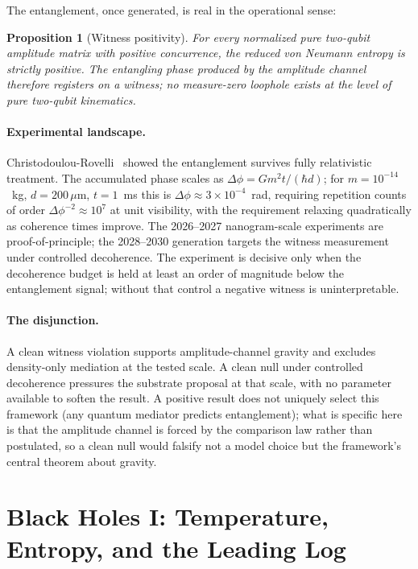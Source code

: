 \documentclass[11pt,letterpaper]{article}
\newtheorem{proposition}[theorem]{Proposition}
\theoremstyle{definition}
\begin{document}
The entanglement, once generated, is real in the operational sense:

\begin{proposition}[Witness positivity]\label{prop:witness}
For every normalized pure two-qubit amplitude matrix with positive
concurrence, the reduced von Neumann entropy is strictly positive.
The entangling phase produced by the amplitude channel therefore
registers on a witness; no measure-zero loophole exists at the level
of pure two-qubit kinematics.
\end{proposition}

\paragraph{Experimental landscape.}
Christodoulou-Rovelli~\cite{ChristodoulouRovelli2019} showed the
entanglement survives fully relativistic treatment.  The accumulated
phase scales as $\Delta\phi=Gm^2t/(\hbar d)$; for
$m=10^{-14}$~kg, $d=200\,\mu$m, $t=1$~ms this is
$\Delta\phi\approx 3\times10^{-4}$~rad, requiring repetition counts of
order $\Delta\phi^{-2}\approx10^{7}$ at unit visibility, with the
requirement relaxing quadratically as coherence times improve.  The
2026--2027 nanogram-scale experiments are proof-of-principle; the
2028--2030 generation targets the witness measurement under controlled
decoherence.  The experiment is decisive only when the decoherence
budget is held at least an order of magnitude below the entanglement
signal; without that control a negative witness is uninterpretable.

\paragraph{The disjunction.}
A clean witness violation supports amplitude-channel gravity and
excludes density-only mediation at the tested scale.  A clean null
under controlled decoherence pressures the substrate proposal at that
scale, with no parameter available to soften the result.  A positive
result does not uniquely select this framework (any quantum mediator
predicts entanglement); what is specific here is that the amplitude
channel is forced by the comparison law rather than postulated, so a
clean null would falsify not a model choice but the framework's
central theorem about gravity.

\section{Black Holes I: Temperature, Entropy, and the Leading Log}
\label{sec:entropy}
\end{document}
